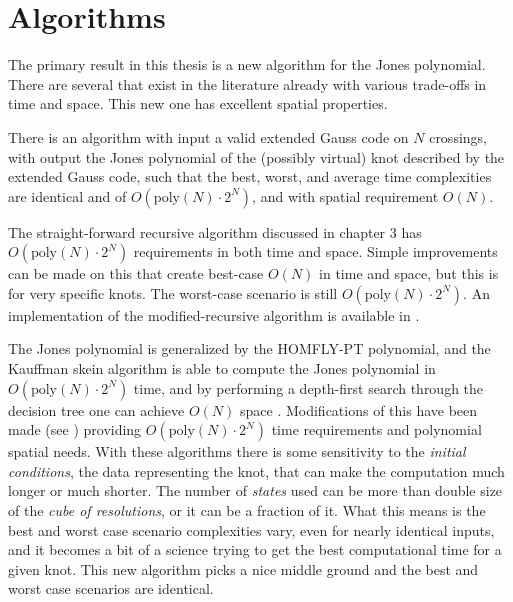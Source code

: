 \section{Algorithms}
    The primary result in this thesis is a new algorithm for the Jones
    polynomial. There are several that exist in the literature already with
    various trade-offs in time and space. This new one has excellent spatial
    properties.
    \begin{theorem}
        There is an algorithm with input a valid extended Gauss code on $N$
        crossings, with output the Jones polynomial of the (possibly virtual)
        knot described by the extended Gauss code, such that the best, worst,
        and average time complexities are identical and of
        $O(\textrm{poly}(N)\cdot{2}^{N})$, and with spatial requirement $O(N)$.
    \end{theorem}
    The straight-forward recursive algorithm discussed in chapter 3 has
    $O(\textrm{poly}(N)\cdot{2}^{N})$ requirements in both time and space.
    Simple improvements can be made on this that create best-case $O(N)$ in
    time and space, but this is for very specific knots. The worst-case scenario
    is still $O(\textrm{poly}(N)\cdot{2}^{N})$. An implementation of the
    modified-recursive algorithm is available in \cite{sage}.
    \par\hfill\par
    The Jones polynomial is generalized by the HOMFLY-PT polynomial, and the
    Kauffman skein algorithm is able to compute the Jones polynomial in
    $O(\textrm{poly}(N)\cdot{2}^{N})$ time, and by performing a depth-first
    search through the decision tree one can achieve $O(N)$ space
    \cite{Burton2018HOMFLFixedParameter}. Modifications of this have been made
    (see \cite{GOUESBET1999271}) providing
    $O(\textrm{poly}(N)\cdot{2}^{N})$ time requirements and polynomial
    spatial needs. With these algorithms there is some sensitivity to the
    \textit{initial conditions}, the data representing the knot, that can
    make the computation much longer or much shorter. The number of
    \textit{states} used can be more than double size of the
    \textit{cube of resolutions}, or it can be a fraction of it. What this
    means is the best and worst case scenario complexities vary, even for
    nearly identical inputs, and it becomes a bit of a science trying to get the
    best computational time for a given knot. This new algorithm picks a nice
    middle ground and the best and worst case scenarios are identical.
    \par\hfill\par
